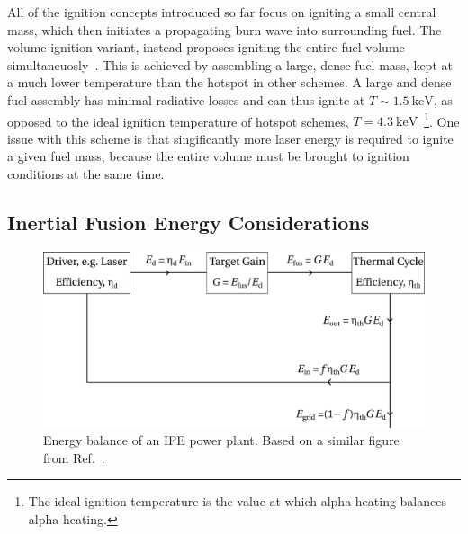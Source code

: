 All of the ignition concepts introduced so far focus on igniting a small central mass, which then initiates a propagating burn wave into surrounding fuel.
The volume-ignition variant, instead proposes igniting the entire fuel volume simultaneuosly~\cite{khoda-bakhsh_advanced_1992,molvig_low_2016}.
This is achieved by assembling a large, dense fuel mass, kept at a much lower temperature than the hotspot in other schemes.
A large and dense fuel assembly has minimal radiative losses and can thus ignite at $T\sim1.5\ \text{keV}$, as opposed to the ideal ignition temperature of hotspot schemes, $T=4.3\ \text{keV}$~\cite{atzeni_physics_2004}\footnote{The ideal ignition temperature is the value at which alpha heating balances alpha heating.}.
One issue with this scheme is that singificantly more laser energy is required to ignite a given fuel mass, because the entire volume must be brought to ignition conditions at the same time.

\subsection{Inertial Fusion Energy Considerations}%
\label{sec:intro_IFE_gain}

\begin{figure}[t!]
    \includegraphics[width=0.8\linewidth]{Introduction/Images/IFE_powerplant.png}
    \centering
    \caption{Energy balance of an \ac{IFE} power plant.
    Based on a similar figure from Ref.~\cite{atzeni_physics_2004}.
    }%
    \label{fig:intro_IFE_energy_balance}
\end{figure}

